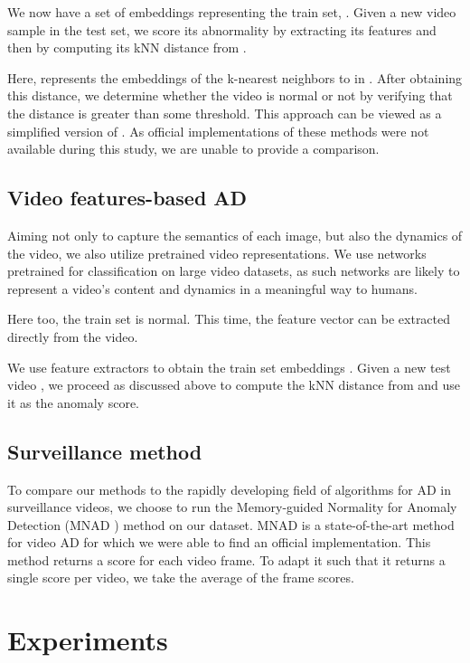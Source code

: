 \documentclass{article}
\begin{document}
We now have a set of embeddings representing the train set, . Given a new video sample  in the test set, we score its abnormality by extracting its features  and then by computing its kNN distance from .



Here,  represents the embeddings of the k-nearest neighbors to  in . After obtaining this distance, we determine whether the video is normal or not by verifying that the distance is greater than some threshold. 
This approach can be viewed as a simplified version of \cite{doshi2020continual,pourreza2021ano}. As official implementations of these methods were not available during this study, we are unable to provide a comparison.

\subsection{Video features-based AD}

Aiming not only to capture the semantics of each image, but also the dynamics of the video, we also utilize pretrained video representations. We use networks pretrained for classification on large video datasets, as such networks are likely to represent a video's content and dynamics in a meaningful way to humans.

Here too, the train set  is normal. This time, the feature vector can be extracted directly from the video. 



We use feature extractors to obtain the train set embeddings . Given a new test video 
, we proceed as discussed above to compute the kNN distance from  and use it as the anomaly score. 

\subsection{Surveillance method}
To compare our methods to the rapidly developing field of algorithms for AD in surveillance videos, we choose to run the Memory-guided Normality for Anomaly Detection (MNAD \cite{park2020learning}) method on our dataset. MNAD is a state-of-the-art method for video AD for which we were able to find an official implementation. This method returns a score for each video frame. To adapt it such that it returns a single score per video, we take the average of the frame scores. 





\section{Experiments}
\end{document}
